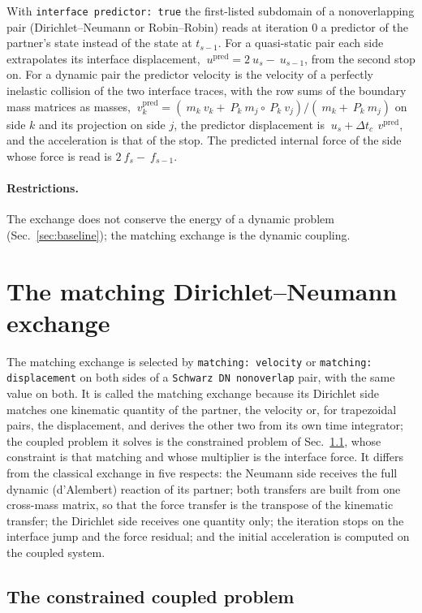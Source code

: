\documentclass[11pt]{article}
\newcommand{\code}[1]{\texttt{#1}}
\begin{document}
With \code{interface predictor: true} the first-listed subdomain of a
nonoverlapping pair (Dirichlet--Neumann or Robin--Robin) reads at
iteration $0$ a predictor of the partner's state instead of the state at
$t_{s-1}$. For a quasi-static pair each side extrapolates its interface
displacement, $~u^{\mathrm{pred}} = 2 ~u_s - ~u_{s-1}$, from the second
stop on. For a dynamic pair the predictor velocity is the velocity of a
perfectly inelastic collision of the two interface traces, with the row
sums of the boundary mass matrices as masses,
$~v^{\mathrm{pred}}_k = (~m_k ~v_k + ~P_k ~m_j \circ ~P_k ~v_j)/(~m_k +
~P_k ~m_j)$ on side $k$ and its projection on side $j$, the predictor
displacement is $~u_s + \Delta t_c\, ~v^{\mathrm{pred}}$, and the
acceleration is that of the stop. The predicted internal force of the
side whose force is read is $2 ~f_s - ~f_{s-1}$.

\paragraph{Restrictions.} The exchange does not conserve the energy of a
dynamic problem (Sec.~\ref{sec:baseline}); the matching exchange is the
dynamic coupling.
\section{The matching Dirichlet--Neumann exchange}
\label{sec:matching}

The matching exchange is selected by \code{matching: velocity} or
\code{matching: displacement} on both sides of a \code{Schwarz DN
nonoverlap} pair, with the same value on both. It is called the matching
exchange because its Dirichlet side matches one kinematic quantity of the
partner, the velocity or, for trapezoidal pairs, the displacement, and
derives the other two from its own time integrator; the coupled problem it
solves is the constrained problem of Sec.~\ref{sec:constrained}, whose
constraint is that matching and whose multiplier is the interface force.
It differs from the classical exchange in five respects: the Neumann side
receives the full dynamic (d'Alembert) reaction of its partner; both
transfers are built from one cross-mass matrix, so that the force transfer
is the transpose of the kinematic transfer; the Dirichlet side receives
one quantity only; the iteration stops on the interface jump and the force
residual; and the initial acceleration is computed on the coupled system.

\subsection{The constrained coupled problem}
\label{sec:constrained}
\end{document}
